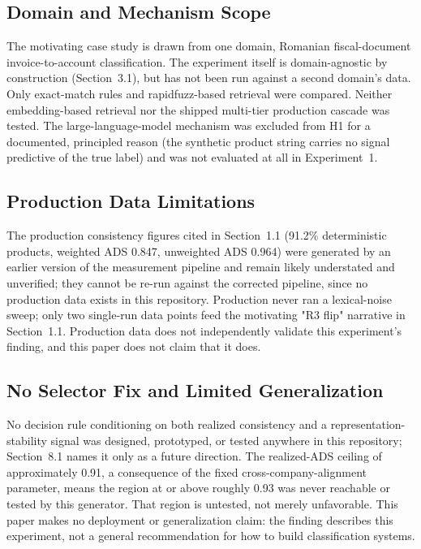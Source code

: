 \documentclass[11pt]{article}
\begin{document}
\subsection{Domain and Mechanism Scope}
\label{sec:domain-mechanism-scope}

The motivating case study is drawn from one domain, Romanian fiscal-document
invoice-to-account classification. The experiment itself is domain-agnostic
by construction (Section~3.1), but has not been run against a second
domain's data. Only exact-match rules and rapidfuzz-based retrieval were
compared. Neither embedding-based retrieval nor the shipped multi-tier
production cascade was tested. The large-language-model mechanism was excluded from H1
for a documented, principled reason (the synthetic product string carries
no signal predictive of the true label) and was not evaluated at all in
Experiment~1.

\subsection{Production Data Limitations}
\label{sec:limits-production-data}

The production consistency figures cited in Section~1.1 (91.2\% deterministic
products, weighted ADS 0.847, unweighted ADS 0.964) were generated by an
earlier version of the measurement pipeline and remain likely understated and
unverified; they cannot be re-run against the corrected pipeline, since no
production data exists in this repository. Production never ran a
lexical-noise sweep; only two single-run data points feed the motivating
"R3 flip" narrative in Section~1.1. Production data does not independently
validate this experiment's finding, and this paper does not claim that it
does.

\subsection{No Selector Fix and Limited Generalization}
\label{sec:limits-no-selector-fix}

No decision rule conditioning on both realized consistency and a
representation-stability signal was designed, prototyped, or tested anywhere
in this repository; Section~8.1 names it only as a future direction. The
realized-ADS ceiling of approximately 0.91, a consequence of the fixed
cross-company-alignment parameter, means the region at or above roughly 0.93
was never reachable or tested by this generator. That region is untested, not merely unfavorable. This paper makes no deployment or generalization claim: the
finding describes this experiment, not a general recommendation for how to
build classification systems.
\end{document}
